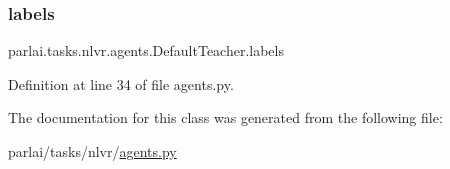 \subsubsection{\texorpdfstring{labels}{labels}}
{\footnotesize\ttfamily parlai.\+tasks.\+nlvr.\+agents.\+Default\+Teacher.\+labels\hspace{0.3cm}{\ttfamily [static]}}



Definition at line 34 of file agents.\+py.



The documentation for this class was generated from the following file\+:\begin{DoxyCompactItemize}
\item 
parlai/tasks/nlvr/\hyperlink{parlai_2tasks_2nlvr_2agents_8py}{agents.\+py}\end{DoxyCompactItemize}
